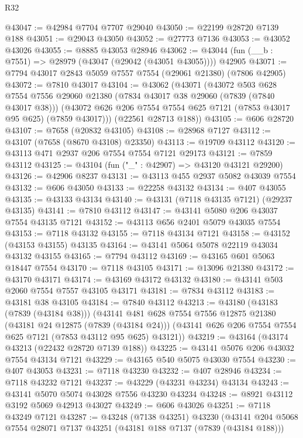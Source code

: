 \begin{lexlean}{R32}
\begin{coremodule}
@43047 := @42984 @7704 @7707 @29040
@43050 := @22199 @28720 @7139 @188
@43051 := @29043 @43050
@43052 := @27773 @7136
@43053 := @43052 @43026
@43055 := @8885 @43053 @28946
@43062 := @43044 (fun (__b : @7551) => @28979 (@43047 (@29042 (@43051 @43055)))) @42905
@43071 := @7794 @43017 @2843 @5059 @7557 @7554 (@29061 @21380) (@7806 @42905)
@43072 := @7810 @43017
@43104 := @43062
    (@43071
      (@43072
        @503
        @628
        @7554
        @7556
        @29060
        @21380
        (@7834 @43017 @38 @29060 (@7839 (@7840 @43017 @38)))
        (@43072 @626 @206 @7554 @7554 @625 @7121 (@7853 @43017 @95 @625) (@7859 @43017)))
      (@22561 @28713 @188))
@43105 := @606 @28720
@43107 := @7658 (@20832 @43105)
@43108 := @28968 @7127
@43112 := @43107 (@7658 (@8670 @43108) @23350)
@43113 := @19709 @43112
@43120 := @43113 @471 @2937 @206 @7554 @7554 @7121 @29173
@43121 := @7859 @43112
@43125 := @43104 (fun ("_" : @42907) => @43120 @43121 @29200)
@43126 := @42906 @8237
@43131 := @43113 @455 @2937 @5082 @43039 @7554
@43132 := @606 @43050
@43133 := @22258 @43132
@43134 := @407 @43055
@43135 := @43133 @43134
@43140 := @43131 (@7118 @43135 @7121) (@29237 @43135)
@43141 := @7810 @43112
@43147 := @43141 @5080 @206 @43037 @7554 @43135 @7121
@43152 := @43113 @656 @2401 @5079 @43035 @7554
@43153 := @7118 @43132
@43155 := @7118 @43134 @7121
@43158 := @43152 (@43153 @43155) @43135
@43164 := @43141 @5064 @5078 @22119 @43034 @43132 @43155
@43165 := @7794 @43112
@43169 := @43165 @601 @5063 @18447 @7554
@43170 := @7118 @43105
@43171 := @13096 @21380
@43172 := @43170 @43171
@43174 := @43169 @43172 @43132
@43180 := @43141 @503 @2060 @7554 @7557 @43105 @43171
@43181 := @7834 @43112
@43183 := @43181 @38 @43105
@43184 := @7840 @43112
@43213 := @43180
    (@43183 (@7839 (@43184 @38)))
    (@43141
      @481
      @628
      @7554
      @7556
      @12875
      @21380
      (@43181 @24 @12875 (@7839 (@43184 @24)))
      (@43141 @626 @206 @7554 @7554 @625 @7121 (@7853 @43112 @95 @625) @43121))
@43219 := @43164 (@43174 @43213 (@22432 @28720 @7139 @188))
@43225 := @43141 @5076 @206 @43032 @7554 @43134 @7121
@43229 := @43165 @540 @5075 @43030 @7554
@43230 := @407 @43053
@43231 := @7118 @43230
@43232 := @407 @28946
@43234 := @7118 @43232 @7121
@43237 := @43229 (@43231 @43234) @43134
@43243 := @43141 @5070 @5074 @43028 @7556 @43230 @43234
@43248 := @8921 @43112 @3192 @5069 @42913 @43027
@43249 := @606 @43026
@43251 := @7118 @43249 @7121
@43287 := @43248
    (@7138 @43251)
    @43230
    (@43141
      @204
      @5068
      @7554
      @28071
      @7137
      @43251
      (@43181 @188 @7137 (@7839 (@43184 @188)))

\end{coremodule}
\end{lexlean}
